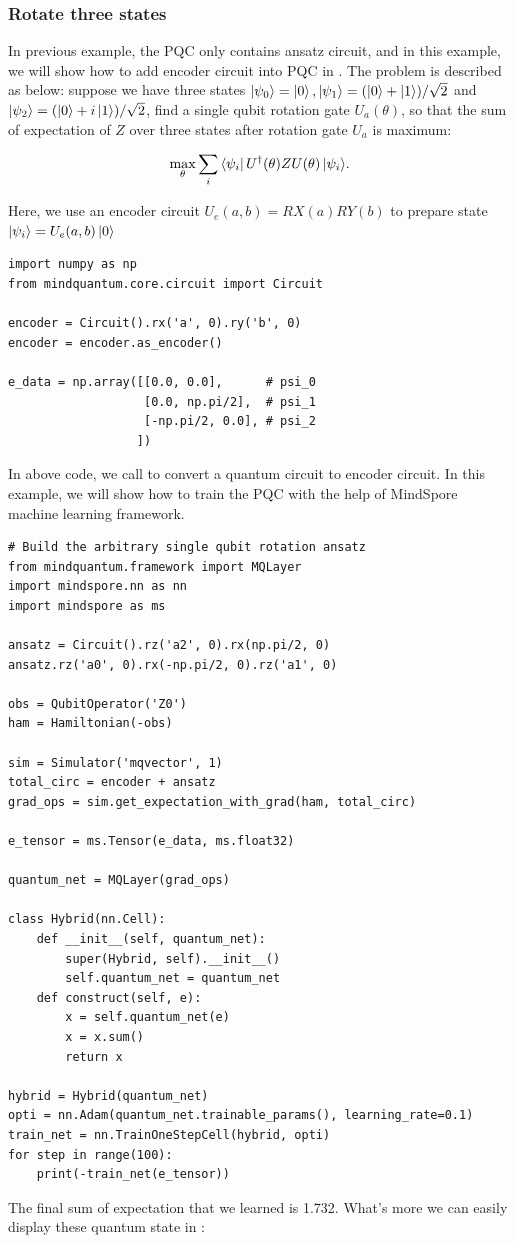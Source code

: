 \subsubsection{Rotate three states}
In previous example, the PQC only contains ansatz circuit, and in this example, we will show how to add encoder circuit into PQC in \MindQuantum. The problem is described as below: suppose we have three states $\ket{\psi_0}=\ket{0},\ket{\psi_1}=(\ket{0}+\ket{1})/\sqrt{2}$ and $\ket{\psi_2}=(\ket{0}+i\ket{1})/\sqrt{2}$, find a single qubit rotation gate $U_a(\theta)$, so that the sum of expectation of $Z$ over three states after rotation gate $U_a$ is maximum:

\begin{equation}
  \max_{\theta}\sum_i{\bra{\psi_i}U^\dagger(\theta)ZU(\theta)\ket{\psi_i}}.
\end{equation}

Here, we use an encoder circuit $U_e(a, b) = RX(a)RY(b)$ to prepare state $\ket{\psi_i}=U_e(a, b)\ket{0}$
\begin{lstlisting}
import numpy as np
from mindquantum.core.circuit import Circuit

encoder = Circuit().rx('a', 0).ry('b', 0)
encoder = encoder.as_encoder()

e_data = np.array([[0.0, 0.0],      # psi_0
                   [0.0, np.pi/2],  # psi_1
                   [-np.pi/2, 0.0], # psi_2
                  ])
\end{lstlisting}
In above code, we call \asencoder to convert a quantum circuit to encoder circuit. In this example, we will show how to train the PQC with the help of MindSpore machine learning framework.

\begin{lstlisting}
# Build the arbitrary single qubit rotation ansatz
from mindquantum.framework import MQLayer
import mindspore.nn as nn
import mindspore as ms

ansatz = Circuit().rz('a2', 0).rx(np.pi/2, 0)
ansatz.rz('a0', 0).rx(-np.pi/2, 0).rz('a1', 0)

obs = QubitOperator('Z0')
ham = Hamiltonian(-obs)

sim = Simulator('mqvector', 1)
total_circ = encoder + ansatz
grad_ops = sim.get_expectation_with_grad(ham, total_circ)

e_tensor = ms.Tensor(e_data, ms.float32)

quantum_net = MQLayer(grad_ops)

class Hybrid(nn.Cell):
    def __init__(self, quantum_net):
        super(Hybrid, self).__init__()
        self.quantum_net = quantum_net
    def construct(self, e):
        x = self.quantum_net(e)
        x = x.sum()
        return x

hybrid = Hybrid(quantum_net)
opti = nn.Adam(quantum_net.trainable_params(), learning_rate=0.1)
train_net = nn.TrainOneStepCell(hybrid, opti)
for step in range(100):
    print(-train_net(e_tensor))
\end{lstlisting}
The final sum of expectation that we learned is 1.732. What's more we can easily display these quantum state in \MindQuantum:


